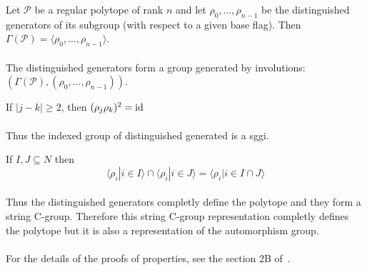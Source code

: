 \begin{proposition}
  Let $\mathcal P$ be a regular polytope of rank $n$ and let $\rho_0, \dots, \rho_{n-1}$ be the distinguished generators of its subgroup (with respect to a given base flag). Then $\Gamma(\mathcal P) = \langle \rho_0, \dots, \rho_{n-1} \rangle$.
\end{proposition}

\paragraph{}
The distinguished generators form a group generated by involutions: $(\Gamma(\mathcal P), (\rho_0, \dots, \rho_{n-1}))$.

\begin{property}
  If $|j - k| \ge 2$, then $(\rho_j \rho_k)^2 = \operatorname{id}$
\end{property}

\paragraph{}
Thus the indexed group of distinguished generated is a sggi.

\begin{property}
  If $I, J \subseteq N$ then
  \[
    \langle \rho_i | i \in I \rangle \cap \langle \rho_i | i \in J \rangle = \langle \rho_i | i \in I \cap J \rangle
  \]
\end{property}

\paragraph{}
Thus the distinguished generators completly define the polytope and they form a string C-group. Therefore this string C-group representation completly defines the polytope but it is also a representation of the automorphism group.

\paragraph{}
For the details of the proofs of properties, see the section 2B of~\cite{abstractRegularPolytopes}.
